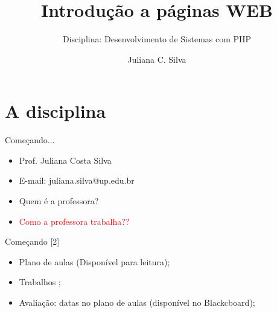 \documentclass{beamer}
\title[Apresentação da Disciplina]{Introdução a páginas WEB}
\subtitle{Disciplina: Desenvolvimento de Sistemas com PHP}
\author{Juliana C. Silva}
\institute{Universidade Positivo}
\begin{document}
\frame{\titlepage}
 

\section{A disciplina}
\begin{frame}{Começando...}
  \begin{itemize}
   \item Prof. Juliana Costa Silva
    \item E-mail: juliana.silva@up.edu.br
    \item Quem é a professora?
    \pause \item \textcolor{red}{Como a professora trabalha??}
  \end{itemize}
\end{frame}
\begin{frame}{Começando [2]}
  \begin{itemize}
   \item Plano de aulas (Disponível para leitura);
    \item Trabalhos ;
    \item Avaliação: datas no plano de aulas (disponível no Blackcboard);
  \end{itemize}
\end{frame}
\end{document}
